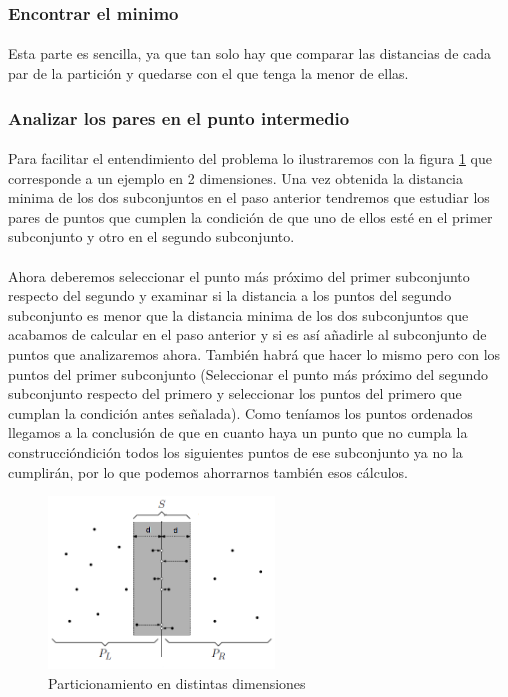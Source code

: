 \documentclass{article}
\begin{document}
		\subsubsection{Encontrar el minimo}

			\paragraph{}
			Esta parte es sencilla, ya que tan solo hay que comparar las distancias de cada par de la partición y quedarse con el que tenga la menor de ellas.

		\subsubsection{Analizar los pares en el punto intermedio}

			\paragraph{}
			Para facilitar el entendimiento del problema lo ilustraremos con la figura \ref{example_border} que corresponde a un ejemplo en 2 dimensiones. Una vez obtenida la distancia minima de los dos subconjuntos en el paso anterior tendremos que estudiar los pares de puntos que cumplen la condición de que uno de ellos esté en el primer subconjunto y otro en el segundo subconjunto.
			
			\paragraph{}
			Ahora deberemos seleccionar el punto más próximo del primer subconjunto respecto del segundo y examinar si la distancia a los puntos del segundo subconjunto es menor que la distancia minima de los dos subconjuntos  que acabamos de calcular en el paso anterior y si es así añadirle al subconjunto de puntos que analizaremos ahora. También habrá que hacer lo mismo pero con los puntos del primer subconjunto (Seleccionar el punto más próximo del segundo subconjunto respecto del primero y seleccionar los puntos del primero que cumplan la condición antes señalada). Como teníamos los puntos ordenados llegamos a la conclusión de que en cuanto haya un punto que no cumpla la construccióndición todos los siguientes puntos de ese subconjunto ya no la cumplirán, por lo que podemos ahorrarnos también esos cálculos.
			
			\begin{figure}[H]
				\centering
				\includegraphics[width=60mm]{strip_closesr1.png}
				\caption{Particionamiento en distintas dimensiones \label{example_border}}
			\end{figure}
			
\end{document}
